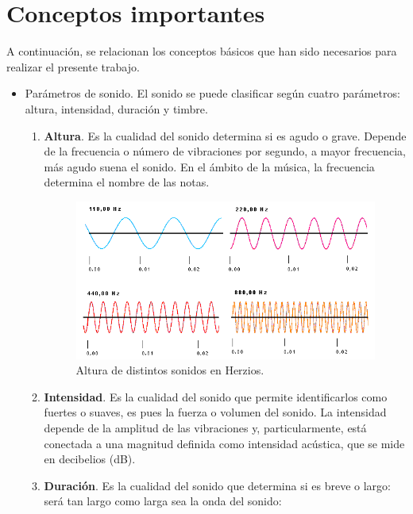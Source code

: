 \documentclass[a4paper, openright, 11pt, titlepage]{report}
\theoremstyle{definition}\newtheorem{defin}[propo]{Definition}
\theoremstyle{definition}\newtheorem{obser}[propo]{Remark}
\theoremstyle{definition}\newtheorem{ejem}[propo]{Ejemplo}
\theoremstyle{definition}\newtheorem{algoritmo}[propo]{Algoritmo}
\begin{document}
\chapter{Conceptos importantes}\label{aped.A}
A continuación, se relacionan los conceptos básicos que han sido necesarios para realizar el presente trabajo.
\begin{itemize}
    \item Parámetros de sonido. El sonido se puede clasificar según cuatro parámetros: altura, intensidad, duración y timbre.
    \begin{enumerate}
        \item \textbf{Altura}. Es la cualidad del sonido determina si es agudo o grave. Depende de la frecuencia o número de vibraciones por segundo, a mayor frecuencia, más agudo suena el sonido. En el ámbito de la música, la frecuencia determina el nombre de las notas.
        \begin{figure}[H]
            \centering
            \includegraphics[scale = 0.7]{Images/Apéndices/Apéndice A/alturaSonido.png}
            \caption{Altura de distintos sonidos en Herzios.}
        \end{figure}
        \item \textbf{Intensidad}. Es la cualidad del sonido que permite identificarlos como fuertes o suaves, es pues la fuerza o volumen del sonido. La intensidad depende de la amplitud de las vibraciones y, particularmente, está conectada a una magnitud definida como intensidad acústica, que se mide en decibelios (dB).
        \item \textbf{Duración}. Es la cualidad del sonido que determina si es breve o largo: será tan largo como larga sea la onda del sonido:
        \begin{figure}[H]
            \centering

\end{figure}
\end{enumerate}
\end{itemize}
\end{document}
